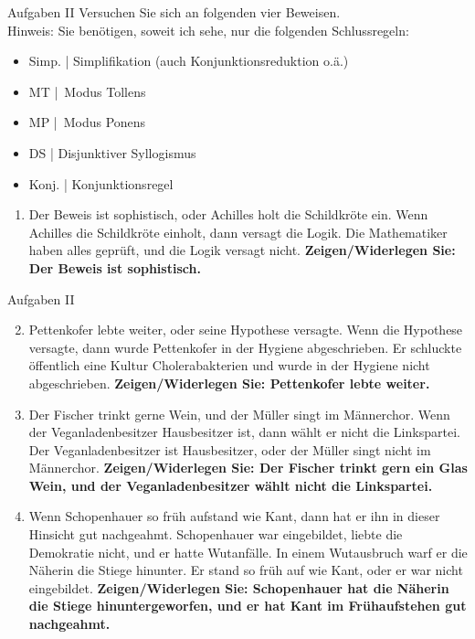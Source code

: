 \begin{frame}
  {Aufgaben II}
  Versuchen Sie sich an folgenden vier Beweisen.\\
  \Halbzeile
  Hinweis: Sie benötigen, soweit ich sehe, nur die folgenden Schlussregeln:
  \Viertelzeile
  \begin{itemize}\footnotesize
    \item Simp. | Simplifikation (auch Konjunktionsreduktion o.\"a.)
    \item MT | Modus Tollens
    \item MP | Modus Ponens
    \item DS | Disjunktiver Syllogismus
    \item Konj. | Konjunktionsregel
  \end{itemize}
  \Halbzeile
  \begin{enumerate}\footnotesize
    \item Der Beweis ist sophistisch, oder Achilles holt die Schildkr\"ote ein. Wenn Achilles die Schildkr\"ote einholt, dann versagt die Logik. Die Mathematiker haben alles gepr\"uft, und die Logik versagt nicht. \textbf{Zeigen/Widerlegen Sie: Der Beweis ist sophistisch.}
  \end{enumerate}
\end{frame}

\begin{frame}
  {Aufgaben II}
  \begin{enumerate}\setcounter{enumi}{1}\footnotesize
    \item Pettenkofer lebte weiter, oder seine Hypothese versagte. Wenn die Hypothese versagte, dann wurde Pettenkofer in der Hygiene abgeschrieben. Er schluckte \"offentlich eine Kultur Cholerabakterien und wurde in der Hygiene nicht abgeschrieben. \textbf{Zeigen/Widerlegen Sie: Pettenkofer lebte weiter.}
    \item Der Fischer trinkt gerne Wein, und der M\"uller singt im M\"annerchor. Wenn der Veganladenbesitzer Hausbesitzer ist, dann w\"ahlt er nicht die Linkspartei. Der Veganladenbesitzer ist Hausbesitzer, oder der M\"uller singt nicht im M\"annerchor. \textbf{Zeigen/Widerlegen Sie: Der Fischer trinkt gern ein Glas Wein, und der Veganladenbesitzer w\"ahlt nicht die Linkspartei.}
    \item Wenn Schopenhauer so fr\"uh aufstand wie Kant, dann hat er ihn in dieser Hinsicht gut nachgeahmt. Schopenhauer war eingebildet, liebte die Demokratie nicht, und er hatte Wutanf\"alle. In einem Wutausbruch warf er die N\"aherin die Stiege hinunter. Er stand so fr\"uh auf wie Kant, oder er war nicht eingebildet. \textbf{Zeigen/Widerlegen Sie: Schopenhauer hat die N\"aherin die Stiege hinuntergeworfen, und er hat Kant im Fr\"uhaufstehen gut nachgeahmt.}
  \end{enumerate}
\end{frame}

